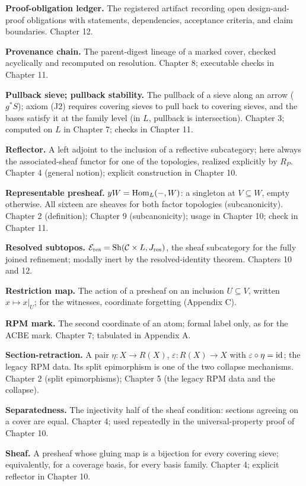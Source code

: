 \textbf{Proof-obligation ledger.} The registered artifact recording
open design-and-proof obligations with statements, dependencies,
acceptance criteria, and claim boundaries. Chapter 12.

\textbf{Provenance chain.} The parent-digest lineage of a marked
cover, checked acyclically and recomputed on resolution. Chapter 8;
executable checks in Chapter 11.

\textbf{Pullback sieve; pullback stability.} The pullback of a sieve
along an arrow ($g^{*}S$); axiom (J2) requires covering sieves to
pull back to covering sieves, and the bases satisfy it at the family
level (in $L$, pullback is intersection). Chapter 3; computed on $L$
in Chapter 7; checks in Chapter 11.

\textbf{Reflector.} A left adjoint to the inclusion of a reflective
subcategory; here always the associated-sheaf functor for one of the
topologies, realized explicitly by $R_P$. Chapter 4 (general notion);
explicit construction in Chapter 10.

\textbf{Representable presheaf.} $yW = \mathrm{Hom}_L(-, W)$: a singleton at
$V \subseteq W$, empty otherwise. All sixteen are sheaves for both
factor topologies (subcanonicity). Chapter 2 (definition); Chapter 9
(subcanonicity); usage in Chapter 10; check in Chapter 11.

\textbf{Resolved subtopos.} $\mathcal{E}_{\mathrm{res}} = \mathrm{Sh}(\mathcal{C} \times L,
J_{\mathrm{res}})$, the sheaf subcategory for the fully joined
refinement; modally inert by the resolved-identity theorem. Chapters
10 and 12.

\textbf{Restriction map.} The action of a presheaf on an inclusion
$U \subseteq V$, written $x \mapsto x|_U$; for the witnesses,
coordinate forgetting (Appendix C).

\textbf{RPM mark.} The second coordinate of an atom; formal label
only, as for the ACBE mark. Chapter 7; tabulated in Appendix A.

\textbf{Section-retraction.} A pair
$\eta : X \to R(X)$, $\varepsilon : R(X) \to X$ with
$\varepsilon \circ \eta = \mathrm{id}$; the legacy RPM data. Its split
epimorphism is one of the two collapse mechanisms. Chapter 2 (split
epimorphisms); Chapter 5 (the legacy RPM data and the collapse).

\textbf{Separatedness.} The injectivity half of the sheaf condition:
sections agreeing on a cover are equal. Chapter 4; used repeatedly in
the universal-property proof of Chapter 10.

\textbf{Sheaf.} A presheaf whose gluing map is a bijection for every
covering sieve; equivalently, for a coverage basis, for every basis
family. Chapter 4; explicit reflector in Chapter 10.

